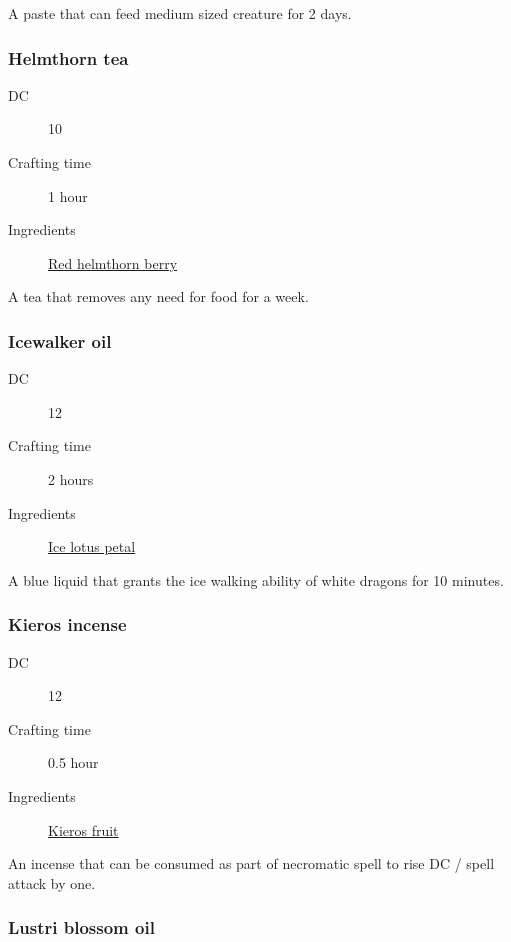 A paste that can feed medium sized creature for 2 days.

\subsubsection{Helmthorn tea}
\label{Helmthorn tea}

\begin{description}
\item [DC] 10
\item [Crafting time] 1 hour
\item [Ingredients] \hyperref[Helmthorn]{Red helmthorn berry}
\end{description}

A tea that removes any need for food for a week.

\subsubsection{Icewalker oil}
\label{Icewalker oil}

\begin{description}
\item [DC] 12
\item [Crafting time] 2 hours
\item [Ingredients] \hyperref[Ice Lotus]{Ice lotus petal}
\end{description}

A blue liquid that grants the ice walking ability of white dragons for 10 minutes.

\subsubsection{Kieros incense}
\label{Kieros incense}

\begin{description}
\item [DC] 12
\item [Crafting time] 0.5 hour
\item [Ingredients] \hyperref[Kieros]{Kieros fruit}
\end{description}

An incense that can be consumed as part of necromatic spell to rise DC / spell attack by one.

\subsubsection{Lustri blossom oil}
\label{Lustri blossom oil}

